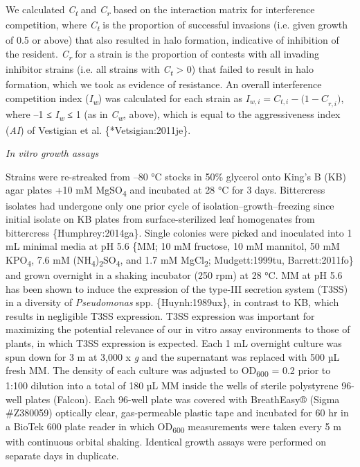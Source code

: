We calculated \emph{C\textsubscript{t}} and \emph{C\textsubscript{r}}
based on the interaction matrix for interference competition, where
\emph{C\textsubscript{t}} is the proportion of successful invasions
(i.e. given growth of 0.5 or above) that also resulted in halo
formation, indicative of inhibition of the resident.
\emph{C\textsubscript{r}} for a strain is the proportion of contests
with all invading inhibitor strains (i.e. all strains with
\emph{C\textsubscript{t}} \textgreater{} 0) that failed to result in
halo formation, which we took as evidence of resistance. An overall
interference competition index (\emph{I\textsubscript{w}}) was
calculated for each strain as \(I_{w,i} = C_{t,i} - {(1 - C}_{r,i})\),
where --1 ≤ \emph{I\textsubscript{w}} ≤ 1 (as in
\emph{C\textsubscript{w}}, above), which is equal to the aggressiveness
index (\emph{AI}) of Vestigian et al. \{*Vetsigian:2011je\}.

\emph{In vitro growth assays}

Strains were re-streaked from --80 °C stocks in 50\% glycerol onto
King's B (KB) agar plates +10 mM MgSO\textsubscript{4} and incubated at
28 °C for 3 days. Bittercress isolates had undergone only one prior
cycle of isolation--growth--freezing since initial isolate on KB plates
from surface-sterilized leaf homogenates from bittercress
\{Humphrey:2014ga\}. Single colonies were picked and inoculated into 1
mL minimal media at pH 5.6 \{MM; 10 mM fructose, 10 mM mannitol, 50 mM
KPO\textsubscript{4}, 7.6 mM
(NH\textsubscript{4})\textsubscript{2}SO\textsubscript{4}, and 1.7 mM
MgCl\textsubscript{2}; Mudgett:1999tu, Barrett:2011fo\} and grown
overnight in a shaking incubator (250 rpm) at 28 °C. MM at pH 5.6 has
been shown to induce the expression of the type-III secretion system
(T3SS) in a diversity of \emph{Pseudomonas} spp. \{Huynh:1989ux\}, in
contrast to KB, which results in negligible T3SS expression. T3SS
expression was important for maximizing the potential relevance of our
in vitro assay environments to those of plants, in which T3SS expression
is expected. Each 1 mL overnight culture was spun down for 3 m at 3,000
x \emph{g} and the supernatant was replaced with 500 µL fresh MM. The
density of each culture was adjusted to OD\textsubscript{600} = 0.2
prior to 1:100 dilution into a total of 180 µL MM inside the wells of
sterile polystyrene 96-well plates (Falcon). Each 96-well plate was
covered with BreathEasy® (Sigma \#Z380059) optically clear,
gas-permeable plastic tape and incubated for 60 hr in a BioTek 600 plate
reader in which OD\textsubscript{600} measurements were taken every 5 m
with continuous orbital shaking. Identical growth assays were performed
on separate days in duplicate.

